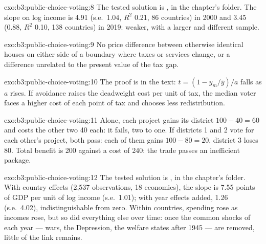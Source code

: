 \begin{solution}{exo:b3:public-choice-voting:8}
The tested solution is , in the chapter's 
folder. The slope on log income is 4.91 (s.e.\ 1.04, $R^2$ 0.21, 86 countries) in 2000 and
3.45 (0.88, $R^2$ 0.10, 138 countries) in 2019: weaker, with a larger and different
sample. %
\end{solution}

\begin{solution}{exo:b3:public-choice-voting:9}
No price difference between otherwise identical houses on either side of a
boundary where taxes or services change, or a difference unrelated to the present
value of the tax gap.
\end{solution}

\begin{solution}{exo:b3:public-choice-voting:10}
The proof is in the text: $t = (1 - y_m/\bar y)/a$ falls as $a$ rises. If avoidance raises the
deadweight cost per unit of tax, the median voter faces a higher cost of each point
of tax and chooses less redistribution.
\end{solution}

\begin{solution}{exo:b3:public-choice-voting:11}
Alone, each project gains its district $100 - 40 = 60$ and costs the other two 40 each:
it fails, two to one. If districts 1 and 2 vote for each other's project, both pass:
each of them gains $100 - 80 = 20$, district 3 loses 80. Total benefit is 200 against a
cost of 240: the trade passes an inefficient package.
\end{solution}

\begin{solution}{exo:b3:public-choice-voting:12}
The tested solution is , in the chapter's
 folder. With country effects (2{,}537 observations, 18 economies),
the slope is 7.55 points of GDP per unit of log income (s.e.\ 1.01); with year effects
added, 1.26 (s.e.\ 4.02), indistinguishable from zero. %
Within countries, spending rose as incomes rose, but so did everything else over
time: once the common shocks of each year --- wars, the Depression, the welfare
states after 1945 --- are removed, little of the link remains.
\end{solution}


